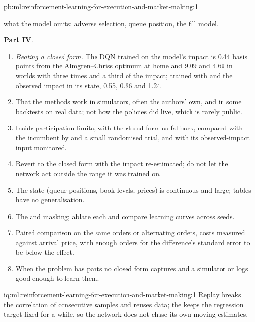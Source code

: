 \begin{solution}{pb:ml:reinforcement-learning-for-execution-and-market-making:1}
\begin{enumerate}[resume]
what the model omits: adverse selection, queue position, the fill model.
\end{enumerate}
\textbf{Part IV.}
\begin{enumerate}[resume]
\item \emph{Beating a closed form.} The DQN trained on the model's impact is 0.44 basis points from the Almgren--Chriss
optimum at home and 9.09 and 4.60 in worlds with three times and a third of the impact; trained with  and
the observed impact in its state, 0.55, 0.86 and 1.24.
\item That the methods work in simulators, often the authors' own, and in some backtests on real data; not how the policies
did live, which is rarely public.
\item Inside participation limits, with the closed form as fallback, compared with the incumbent by  and
a small randomised trial, and with its observed-impact input monitored.
\item Revert to the closed form with the impact re-estimated; do not let the network act outside the range it was trained on.
\item The state (queue positions, book levels, prices) is continuous and large; tables have no generalisation.
\item The  and masking; ablate each and compare learning curves across seeds.
\item Paired comparison on the same orders or alternating orders, costs measured against arrival price, with enough orders
for the difference's standard error to be below the effect.
\item When the problem has parts no closed form captures and a simulator or logs good enough to learn them.
\end{enumerate}
\end{solution}

\begin{solution}{iq:ml:reinforcement-learning-for-execution-and-market-making:1}
Replay breaks the correlation of consecutive samples and reuses data; the  keeps the regression target fixed for
a while, so the network does not chase its own moving estimates.
\end{solution}

